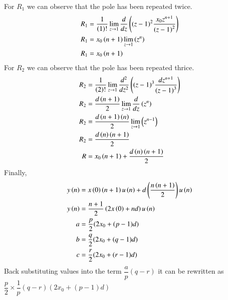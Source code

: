 \documentclass[journal,12pt,twocolumn]{IEEEtran}
\theoremstyle{remark}
\begin{document}
For $R_1$ we can observe that the pole has been repeated twice.
\begin{align}
    R_1&=\frac{1}{\left(1\right)!}\lim\limits_{z\to 1}\frac{d}{dz}\left({(z-1)}^{2}\frac{x_0z^{n+1}}{{(z-1)}^2}\right)\\
    R_1&=x_0\left(n+1\right)\lim\limits_{z\to 1}\left(z^n\right)\\
    R_1&=x_0\left(n+1\right)\\
\end{align}
For $R_2$ we can observe that the pole has been repeated thrice.
\begin{align}
    R_2&=\frac{1}{\left(2\right)!}\lim\limits_{z\to 1}\frac{d^{2}}{dz^{2}}\left({(z-1)}^{3}\frac{dz^{n+1}}{{(z-1)}^3}\right)\\
    R_2&=\frac{d\left(n+1\right)}{2}\lim\limits_{z\to 1}\frac{d}{dz}\left(z^n\right)\\
    R_2&=\frac{d\left(n+1\right)\left(n\right)}{2}\lim\limits_{z\to 1}\left(z^{n-1}\right)\\
    R_2&=\frac{d\left(n\right)\left(n+1\right)}{2}\\
    R&=x_0\left(n+1\right)+\frac{d\left(n\right)\left(n+1\right)}{2}
\end{align}
Finally,
\begin{align}
    y\left(n\right)&=x\left(0\right)\left(n+1\right)u\left(n\right)+d\left(\dfrac{{n\left(n+1\right)}}{2}\right)u\left(n\right)\\
    y\left(n\right)&=\dfrac{n+1}{2}\left(2x\left(0\right)+nd\right)u\left(n\right)\\
    a&=\dfrac{p}{2}(2x_0+(p-1)d)\\
    b&=\dfrac{q}{2}(2x_0+(q-1)d)\\
    c&=\dfrac{r}{2}(2x_0+(r-1)d)
\end{align}
Back substituting values into the term $\dfrac{a}{p}(q-r)$ it can be rewritten as $\dfrac{p}{2} \times \dfrac{1}{p}(q-r)(2x_0+(p-1)d)$
\end{document}
